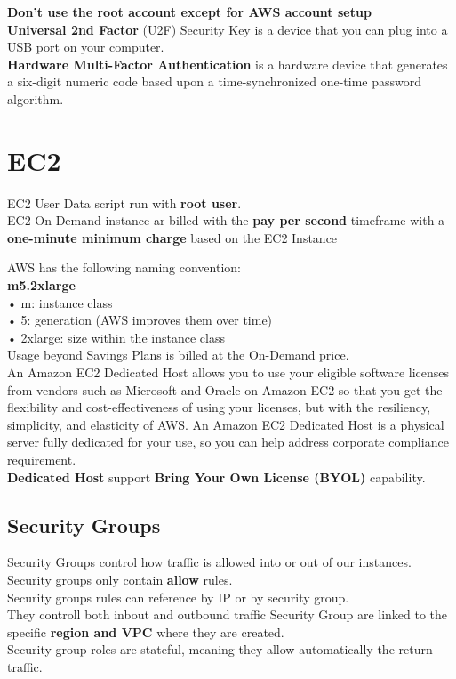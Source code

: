 \documentclass[12pt, letterpaper, twoside]{article}
\begin{document}
\textbf{Don’t use the root account except for AWS account setup}\\

\textbf{Universal 2nd Factor} (U2F) Security Key is a device that you can plug into a USB port on your computer.\\
\textbf{Hardware Multi-Factor Authentication} is a hardware device that generates a six-digit numeric code based upon a 
time-synchronized one-time password algorithm.\\

\section{EC2}

EC2 User Data script run with \textbf{root user}.\\
EC2 On-Demand instance ar billed with the \textbf{pay per second} timeframe with a \textbf{one-minute minimum charge} based 
on the EC2 Instance

AWS has the following naming convention:\\
\textbf{m5.2xlarge}\\
• m: instance class\\
• 5: generation (AWS improves them over time)\\
• 2xlarge: size within the instance class\\

Usage beyond Savings Plans is billed at the On-Demand price.\\

An Amazon EC2 Dedicated Host allows you to use your eligible software licenses from vendors such as Microsoft and Oracle 
on Amazon EC2 so that you get the flexibility and cost-effectiveness of using your licenses, but with the resiliency, 
simplicity, and elasticity of AWS. An Amazon EC2 Dedicated Host is a physical server fully dedicated for your use, 
so you can help address corporate compliance requirement.\\

\textbf{Dedicated Host} support \textbf{Bring Your Own License (BYOL)} capability.\\ 

\subsection{Security Groups}
Security Groups control how traffic is allowed into or out of our instances.\\
Security groups only contain \textbf{allow} rules.\\
Security groups rules can reference by IP or by security group.\\
They controll both inbout and outbound traffic
Security Group are linked to the specific \textbf{region and VPC} where they are created.\\
Security group roles are stateful, meaning they allow automatically the return traffic.
\end{document}
